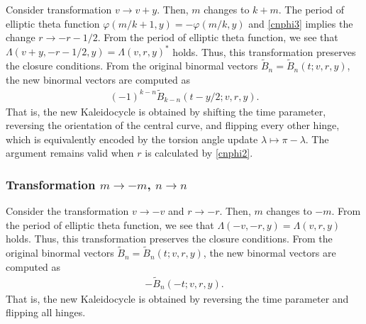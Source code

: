 \documentclass[10pt,leqno]{amsart}
\numberwithin{equation}{section}
\begin{document}
Consider transformation $v\rightarrow v+y$.
Then, $m$ changes to $k + m$.
The period of elliptic theta function $\varphi(m/k+1,y)=-\varphi(m/k,y)$
and \eqref{cnphi3} implies the change $r\rightarrow -r-1/2$.
From the period of elliptic theta function, we see that $\Lambda(v+y, -r-1/2, y)=\Lambda(v, r, y)^{*}$ holds. Thus, this transformation preserves the closure conditions.
From the original binormal vectors $\widetilde{B}_{n}=\widetilde{B}_{n}(t;v,r,y)$,
the new binormal vectors are computed as
\begin{equation}
    \begin{split}
        (-1)^{k-n}\widetilde{B}_{k-n}\left(t-y/2; v, r, y\right).
    \end{split}
\end{equation}
That is, the new Kaleidocycle is obtained by shifting the time parameter, reversing the orientation of the central curve, and flipping every other hinge,
which is equivalently encoded by the torsion angle update  $\lambda\mapsto \pi - \lambda$.
The argument remains valid when $r$ is calculated by \eqref{cnphi2}.

\subsubsection{Transformation $m\rightarrow -m$, $n\rightarrow n$}\label{subsubsection:-m}
Consider the transformation $v\rightarrow -v$ and $r\rightarrow -r$.
Then, $m$ changes to $-m$.
From the period of elliptic theta function, we see that $\Lambda(-v, -r, y)=\Lambda(v, r, y)$ holds. Thus, this transformation preserves the closure conditions.
From the original binormal vectors $\widetilde{B}_{n}=\widetilde{B}_{n}(t;v,r,y)$,
the new binormal vectors are computed as
\begin{equation}
    \begin{split}
 -\widetilde{B}_{n}\left(-t; v, r, y\right).
    \end{split}
\end{equation}
That is, the new Kaleidocycle is obtained by reversing the time parameter and flipping all hinges.

\end{document}
